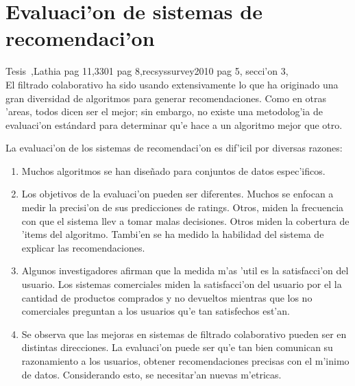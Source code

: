\documentclass[11pt]{article}
\begin{document}
\section{Evaluaci'on de sistemas de recomendaci'on}

Tesis~\cite{eemcs13083},Lathia pag 11,3301 pag 8,recsyssurvey2010 pag 5, secci'on 3,\cite{Herlocker04evaluatingcollaborative}\\

El filtrado colaborativo ha sido usando extensivamente lo que ha originado una gran diversidad de algoritmos para generar recomendaciones. Como en otras 'areas, todos dicen ser el mejor; sin embargo, no existe una metodolog'ia de evaluaci'on estándard para determinar qu'e hace a un algoritmo mejor que otro.

La evaluaci'on de los sistemas de recomendaci'on es dif'icil por diversas razones:
\begin{enumerate}
\item Muchos algoritmos se han dise\~{n}ado para conjuntos de datos espec'ificos.
\item Los objetivos de la evaluaci'on pueden ser diferentes. Muchos se enfocan a medir la precisi'on de sus predicciones de ratings. Otros, miden la frecuencia con que el sistema llev a tomar malas decisiones. Otros miden la cobertura de 'items del algoritmo. Tambi'en se ha medido la habilidad del sistema de explicar las recomendaciones.
\item Algunos investigadores afirman que la medida m'as 'util es la satisfacci'on del usuario. Los sistemas comerciales miden la satisfacci'on del usuario por el la cantidad de productos comprados y no devueltos mientras que los no comerciales preguntan a los usuarios qu'e tan satisfechos est'an.
\item Se observa que las mejoras en sistemas de filtrado colaborativo pueden ser en distintas direcciones. La evaluaci'on puede ser qu'e tan bien comunican su razonamiento a los usuarios, obtener recomendaciones precisas con el m'inimo de datos. Considerando esto, se necesitar'an nuevas m'etricas.
\end{enumerate}



\end{document}
